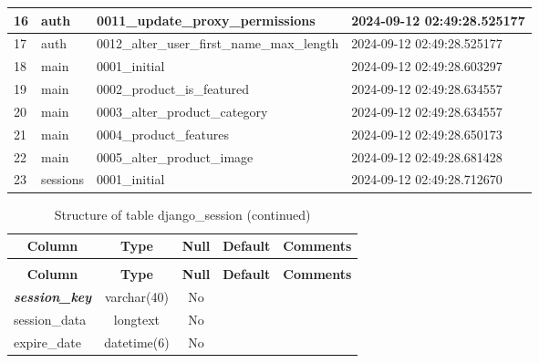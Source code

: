 \begin{longtable}{|l|l|l|l|}
16 & auth & 0011\_update\_proxy\_permissions & 2024-09-12 02:49:28.525177 \\ \hline 
17 & auth & 0012\_alter\_user\_first\_name\_max\_length & 2024-09-12 02:49:28.525177 \\ \hline 
18 & main & 0001\_initial & 2024-09-12 02:49:28.603297 \\ \hline 
19 & main & 0002\_product\_is\_featured & 2024-09-12 02:49:28.634557 \\ \hline 
20 & main & 0003\_alter\_product\_category & 2024-09-12 02:49:28.634557 \\ \hline 
21 & main & 0004\_product\_features & 2024-09-12 02:49:28.650173 \\ \hline 
22 & main & 0005\_alter\_product\_image & 2024-09-12 02:49:28.681428 \\ \hline 
23 & sessions & 0001\_initial & 2024-09-12 02:49:28.712670 \\ \hline 
 \end{longtable}

%
%
 \begin{longtable}{|l|c|c|c|l|} 
 \caption{Structure of table django\_session} \label{tab:django_session-structure} \\
 \hline \multicolumn{1}{|c|}{\textbf{Column}} & \multicolumn{1}{|c|}{\textbf{Type}} & \multicolumn{1}{|c|}{\textbf{Null}} & \multicolumn{1}{|c|}{\textbf{Default}} & \multicolumn{1}{|c|}{\textbf{Comments}} \\ \hline \hline
\endfirsthead
 \caption{Structure of table django\_session (continued)} \\ 
 \hline \multicolumn{1}{|c|}{\textbf{Column}} & \multicolumn{1}{|c|}{\textbf{Type}} & \multicolumn{1}{|c|}{\textbf{Null}} & \multicolumn{1}{|c|}{\textbf{Default}} & \multicolumn{1}{|c|}{\textbf{Comments}} \\ \hline \hline \endhead \endfoot 
\textbf{\textit{session\_key}} & varchar(40) & No &  \\ \hline 
session\_data & longtext & No &  \\ \hline 
expire\_date & datetime(6) & No &  \\ \hline 
 \end{longtable}

